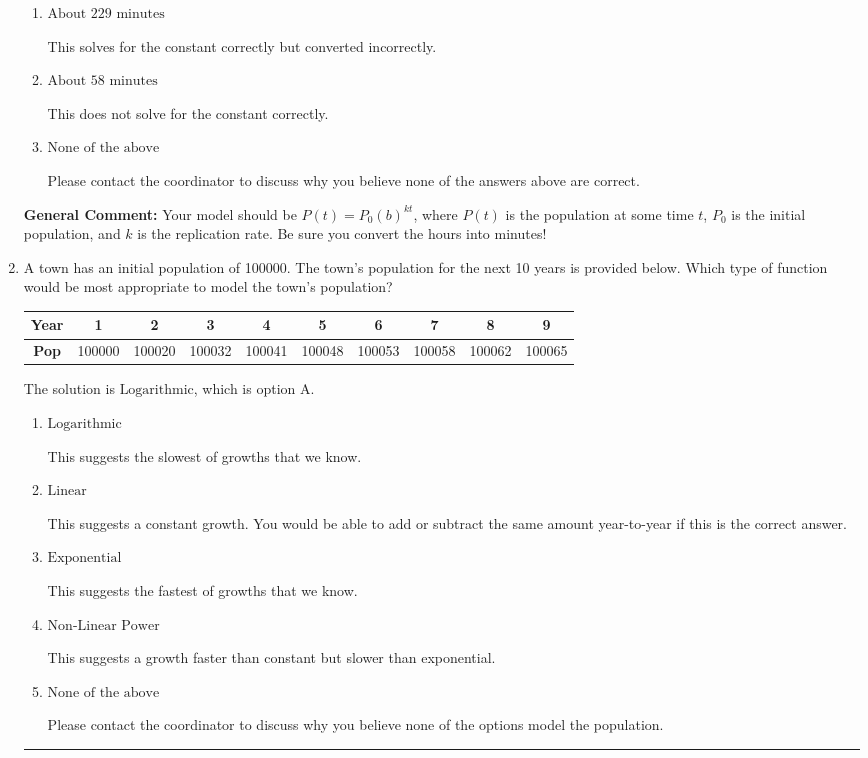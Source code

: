 \documentclass{extbook}[14pt]
\newcommand{\litem}[1]{\item #1

\rule{\textwidth}{0.4pt}}
\begin{document}
\begin{enumerate}
{\begin{enumerate}[label=\Alph*.]
* This is the correct option.
\item \( \text{About } 229 \text{ minutes} \)

This solves for the constant correctly but converted incorrectly.
\item \( \text{About } 58 \text{ minutes} \)

This does not solve for the constant correctly.
\item \( \text{None of the above} \)

Please contact the coordinator to discuss why you believe none of the answers above are correct.
\end{enumerate}

\textbf{General Comment:} Your model should be $P(t) = P_0(b)^{kt}$, where $P(t)$ is the population at some time $t$, $P_0$ is the initial population, and $k$ is the replication rate. Be sure you convert the hours into minutes!
}
\litem{
A town has an initial population of 100000. The town's population for the next 10 years is provided below. Which type of function would be most appropriate to model the town's population?


\begin{tabular}{c|c|c|c|c|c|c|c|c|c}
\textbf{Year} &1 &2 &3 &4 &5 &6 &7 &8 &9\tabularnewline \hline
\textbf{Pop} &100000 &100020 &100032 &100041 &100048 &100053 &100058 &100062 &100065\end{tabular}The solution is \( \text{Logarithmic} \), which is option A.\begin{enumerate}[label=\Alph*.]
\item \( \text{Logarithmic} \)

This suggests the slowest of growths that we know.
\item \( \text{Linear} \)

This suggests a constant growth. You would be able to add or subtract the same amount year-to-year if this is the correct answer.
\item \( \text{Exponential} \)

This suggests the fastest of growths that we know.
\item \( \text{Non-Linear Power} \)

This suggests a growth faster than constant but slower than exponential.
\item \( \text{None of the above} \)

Please contact the coordinator to discuss why you believe none of the options model the population.
\end{enumerate}

}
\end{enumerate}
\end{document}

